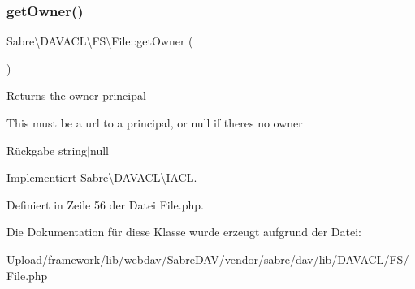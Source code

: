 \mbox{\label{class_sabre_1_1_d_a_v_a_c_l_1_1_f_s_1_1_file_aae1b5e16fe8fea6323e590710611f656}} 
\subsubsection{\texorpdfstring{get\+Owner()}{getOwner()}}
{\footnotesize\ttfamily Sabre\textbackslash{}\+D\+A\+V\+A\+C\+L\textbackslash{}\+F\+S\textbackslash{}\+File\+::get\+Owner (\begin{DoxyParamCaption}{ }\end{DoxyParamCaption})}

Returns the owner principal

This must be a url to a principal, or null if there\textquotesingle{}s no owner

\begin{DoxyReturn}{Rückgabe}
string$\vert$null 
\end{DoxyReturn}


Implementiert \mbox{\hyperlink{interface_sabre_1_1_d_a_v_a_c_l_1_1_i_a_c_l_a05f531b4ae1a86eab4e6e95b0413390e}{Sabre\textbackslash{}\+D\+A\+V\+A\+C\+L\textbackslash{}\+I\+A\+CL}}.



Definiert in Zeile 56 der Datei File.\+php.



Die Dokumentation für diese Klasse wurde erzeugt aufgrund der Datei\+:\begin{DoxyCompactItemize}
\item 
Upload/framework/lib/webdav/\+Sabre\+D\+A\+V/vendor/sabre/dav/lib/\+D\+A\+V\+A\+C\+L/\+F\+S/File.\+php\end{DoxyCompactItemize}
